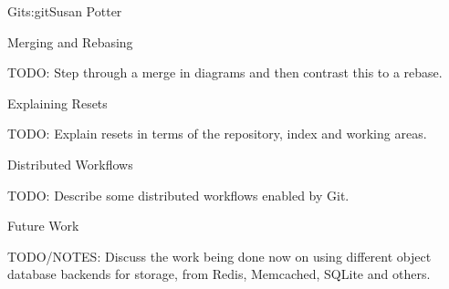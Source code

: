 \begin{aosachapter}{Git}{s:git}{Susan Potter}
\begin{aosasect1}{Merging and Rebasing}

TODO: Step through a merge in diagrams and then contrast this to a rebase.

\end{aosasect1}

\begin{aosasect1}{Explaining Resets}

TODO: Explain resets in terms of the repository, index and working areas.

\end{aosasect1}

\begin{aosasect1}{Distributed Workflows}

TODO: Describe some distributed workflows enabled by Git.

\end{aosasect1}

\begin{aosasect1}{Future Work}

TODO/NOTES:
Discuss the work being done now on using different object database backends
for storage, from Redis, Memcached, SQLite and others.

\end{aosasect1}

\end{aosachapter}

